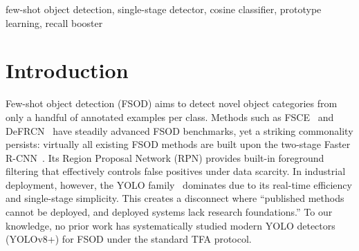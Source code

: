 \documentclass[conference]{IEEEtran}
\newcommand{\myhl}[1]{\colorbox{hlc}{\mbox{#1}}}
\begin{document}
\begin{abstract}
Few-shot object detection (FSOD) remains predominantly built upon two-stage architectures such as Faster R-CNN, while single-stage YOLO-series detectors---widely adopted in industrial deployment---lack systematic investigation under few-shot constraints. We present VCP (Visual-Cosine-Prototype), a single-stage FSOD framework that combines YOLO11s with a cosine classifier and prototype learning under the TFA protocol. On PASCAL VOC, VCP achieves 72.2\% mAP50 (3-split mean) at 10-shot with only 9.5M parameters ($\sim$1/6 of competing methods). Notably, the same approach underperforms standard fine-tuning on MS COCO. Through systematic precision-recall decomposition across 24 comparison groups, we uncover a consistent pattern: the cosine classifier acts as a \textit{Recall Booster}---reliably shifting the operating point toward higher recall at the expense of precision. We formalize the P-R Tradeoff Hypothesis: the net benefit depends on the product of baseline recall headroom and the dataset-specific P-R tradeoff ratio, which jointly explain the VOC-COCO divergence. We further leverage Florence-2 semantic prototypes as auxiliary priors, yielding modest gains (+0.5 pp at 10-shot) with \textit{zero VLM inference overhead}. VCP runs at 54.4 FPS, 4--5$\times$ faster than two-stage FSOD methods.
\end{abstract}

\begin{IEEEkeywords}
few-shot object detection, single-stage detector, cosine classifier, prototype learning, recall booster
\end{IEEEkeywords}

\section{Introduction}

Few-shot object detection (FSOD) aims to detect novel object categories from only a handful of annotated examples per class. Methods such as FSCE~\cite{sun2021fsce} and DeFRCN~\cite{qiao2021defrcn} have steadily advanced FSOD benchmarks, yet a striking commonality persists: virtually all existing FSOD methods are built upon the two-stage Faster R-CNN~\cite{ren2015faster}. Its Region Proposal Network (RPN) provides built-in foreground filtering that effectively controls false positives under data scarcity. In industrial deployment, however, the YOLO family~\myhl{\cite{terven2023yolo,jocher2023ultralytics}} dominates due to its real-time efficiency and single-stage simplicity. This creates a disconnect where ``published methods cannot be deployed, and deployed systems lack research foundations.'' To our knowledge, no prior work has systematically studied modern YOLO detectors (YOLOv8+) for FSOD under the standard TFA protocol.
\end{document}
